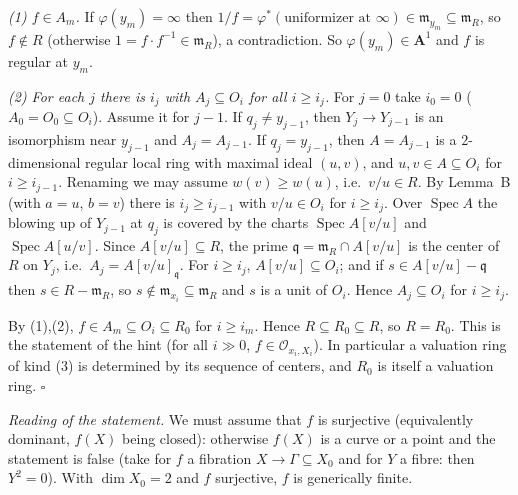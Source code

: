 \documentclass[11pt]{article}
\begin{document}
\emph{(1) $f\in A_m$.} If $\varphi(y_m)=\infty$ then $1/f=\varphi^*(\text{uniformizer at }\infty)\in\mathfrak m_{y_m}\subseteq\mathfrak m_R$, so $f\notin R$ (otherwise $1=f\cdot f^{-1}\in\mathfrak m_R$), a contradiction. So $\varphi(y_m)\in\mathbf A^1$ and $f$ is regular at $y_m$.

\emph{(2) For each $j$ there is $i_j$ with $A_j\subseteq O_i$ for all $i\ge i_j$.} For $j=0$ take $i_0=0$ ($A_0=O_0\subseteq O_i$). Assume it for $j-1$. If $q_j\ne y_{j-1}$, then $Y_j\to Y_{j-1}$ is an isomorphism near $y_{j-1}$ and $A_j=A_{j-1}$. If $q_j=y_{j-1}$, then $A=A_{j-1}$ is a $2$-dimensional regular local ring with maximal ideal $(u,v)$, and $u,v\in A\subseteq O_{i}$ for $i\ge i_{j-1}$. Renaming we may assume $w(v)\ge w(u)$, i.e.\ $v/u\in R$. By Lemma~B (with $a=u$, $b=v$) there is $i_j\ge i_{j-1}$ with $v/u\in O_i$ for $i\ge i_j$. Over $\operatorname{Spec}A$ the blowing up of $Y_{j-1}$ at $q_j$ is covered by the charts $\operatorname{Spec}A[v/u]$ and $\operatorname{Spec}A[u/v]$. Since $A[v/u]\subseteq R$, the prime $\mathfrak q=\mathfrak m_R\cap A[v/u]$ is the center of $R$ on $Y_j$, i.e.\ $A_j=A[v/u]_{\mathfrak q}$. For $i\ge i_j$, $A[v/u]\subseteq O_i$; and if $s\in A[v/u]-\mathfrak q$ then $s\in R-\mathfrak m_R$, so $s\notin\mathfrak m_{x_i}\subseteq\mathfrak m_R$ and $s$ is a unit of $O_i$. Hence $A_j\subseteq O_i$ for $i\ge i_j$.

By (1),(2), $f\in A_m\subseteq O_i\subseteq R_0$ for $i\ge i_m$. Hence $R\subseteq R_0\subseteq R$, so $R=R_0$. This is the statement of the hint (for all $i\gg0$, $f\in\mathcal O_{x_i,X_i}$). In particular a valuation ring of kind (3) is determined by its sequence of centers, and $R_0$ is itself a valuation ring. \hfill$\square$

\pf
\emph{Reading of the statement.} We must assume that $f$ is surjective (equivalently dominant, $f(X)$ being closed): otherwise $f(X)$ is a curve or a point and the statement is false (take for $f$ a fibration $X\to\Gamma\subseteq X_0$ and for $Y$ a fibre: then $Y^2=0$). With $\dim X_0=2$ and $f$ surjective, $f$ is generically finite.
\end{document}
